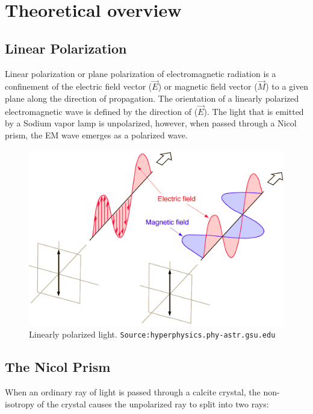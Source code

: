 \documentclass{dkpinto-report}
\begin{document}
\section{Theoretical overview}

\subsection{Linear Polarization}
Linear polarization or plane polarization of electromagnetic radiation is a confinement of the electric field vector ($\vec{E}$) or magnetic field vector ($\vec{M}$) to a given plane along the direction of propagation. The orientation of a linearly polarized electromagnetic wave is defined by the direction of ($\vec{E}$). The light that is emitted by a Sodium vapor lamp is unpolarized, however, when passed through a Nicol prism, the EM wave emerges as a polarized wave. 

\begin{figure}[h] \label{img:1}  %
\caption{Linearly polarized light. \texttt{Source:hyperphysics.phy-astr.gsu.edu}} %
\centering  %
\includegraphics[scale=0.4]{Images/Lin_Pol.png}
\end{figure}

\subsection{The Nicol Prism}
When an ordinary ray of light is passed through a calcite crystal, the non-isotropy of the crystal causes the unpolarized ray to split into two rays:
\end{document}

